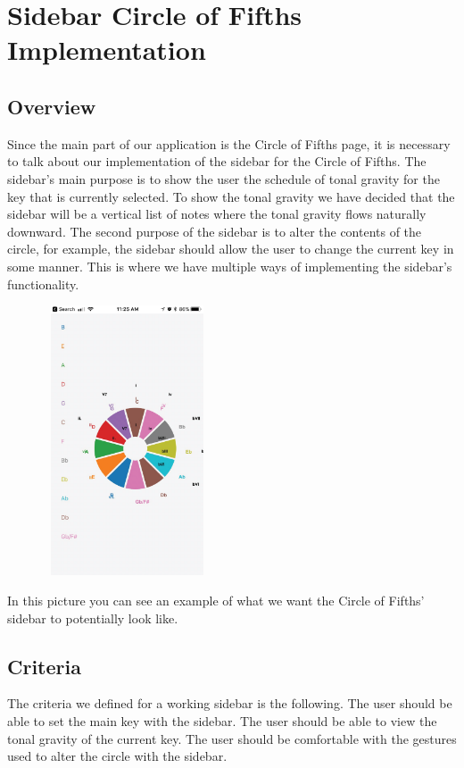 \documentclass[onecolumn, draftclsnofoot,10pt, compsoc]{IEEEtran}
\begin{document}

\section{Sidebar Circle of Fifths Implementation}
\subsection{Overview}
Since the main part of our application is the Circle of Fifths page, it is necessary to talk about our implementation of the sidebar for the Circle of Fifths.
The sidebar's main purpose is to show the user the schedule of tonal gravity for the key that is currently selected.
To show the tonal gravity we have decided that the sidebar will be a vertical list of notes where the tonal gravity flows naturally downward.
The second purpose of the sidebar is to alter the contents of the circle, for example, the sidebar should allow the user to change the current key in some manner.
This is where we have multiple ways of implementing the sidebar's functionality.

\begin{figure}[H]
    \centering
    \includegraphics[width=5cm, height=8cm]{circle.eps}
\end{figure}

In this picture you can see an example of what we want the Circle of Fifths' sidebar to potentially look like.

\subsection{Criteria}
The criteria we defined for a working sidebar is the following.
The user should be able to set the main key with the sidebar.
The user should be able to view the tonal gravity of the current key.
The user should be comfortable with the gestures used to alter the circle with the sidebar.
\end{document}
